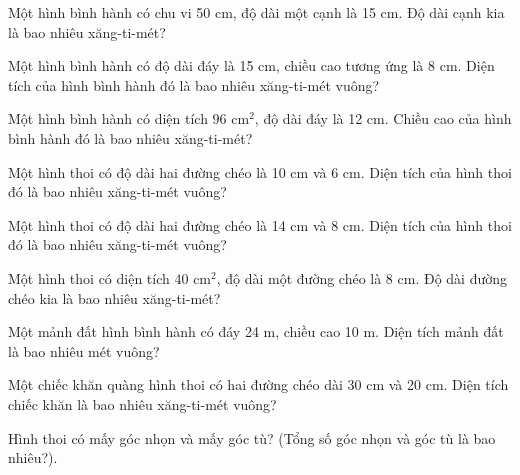 \begin{ex}
Một hình bình hành có chu vi 50 cm, độ dài một cạnh là 15 cm. Độ dài cạnh kia là bao nhiêu xăng-ti-mét?
\end{ex}

\begin{ex}
Một hình bình hành có độ dài đáy là 15 cm, chiều cao tương ứng là 8 cm. Diện tích của hình bình hành đó là bao nhiêu xăng-ti-mét vuông?
\end{ex}

\begin{ex}
Một hình bình hành có diện tích $96\text{ cm}^2$, độ dài đáy là 12 cm. Chiều cao của hình bình hành đó là bao nhiêu xăng-ti-mét?
\end{ex}

\begin{ex}
Một hình thoi có độ dài hai đường chéo là 10 cm và 6 cm. Diện tích của hình thoi đó là bao nhiêu xăng-ti-mét vuông?
\end{ex}

\begin{ex}
Một hình thoi có độ dài hai đường chéo là 14 cm và 8 cm. Diện tích của hình thoi đó là bao nhiêu xăng-ti-mét vuông?
\end{ex}

\begin{ex}
Một hình thoi có diện tích $40\text{ cm}^2$, độ dài một đường chéo là 8 cm. Độ dài đường chéo kia là bao nhiêu xăng-ti-mét?
\end{ex}

\begin{ex}
Một mảnh đất hình bình hành có đáy 24 m, chiều cao 10 m. Diện tích mảnh đất là bao nhiêu mét vuông?
\end{ex}

\begin{ex}
Một chiếc khăn quàng hình thoi có hai đường chéo dài 30 cm và 20 cm. Diện tích chiếc khăn là bao nhiêu xăng-ti-mét vuông?
\end{ex}

\begin{ex}
Hình thoi có mấy góc nhọn và mấy góc tù? (Tổng số góc nhọn và góc tù là bao nhiêu?).
\end{ex}

